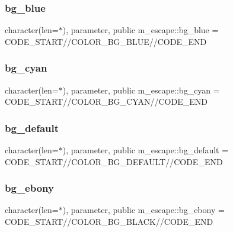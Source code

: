 \subsubsection{\texorpdfstring{bg\+\_\+blue}{bg\_blue}}
{\footnotesize\ttfamily character(len=$\ast$), parameter, public m\+\_\+escape\+::bg\+\_\+blue = C\+O\+D\+E\+\_\+\+S\+T\+A\+RT//C\+O\+L\+O\+R\+\_\+\+B\+G\+\_\+\+B\+L\+UE//C\+O\+D\+E\+\_\+\+E\+ND}

\mbox{\label{namespacem__escape_a7b7a979cd6dc44533f962d323c65a7b6}} 
\subsubsection{\texorpdfstring{bg\+\_\+cyan}{bg\_cyan}}
{\footnotesize\ttfamily character(len=$\ast$), parameter, public m\+\_\+escape\+::bg\+\_\+cyan = C\+O\+D\+E\+\_\+\+S\+T\+A\+RT//C\+O\+L\+O\+R\+\_\+\+B\+G\+\_\+\+C\+Y\+AN//C\+O\+D\+E\+\_\+\+E\+ND}

\mbox{\label{namespacem__escape_a329b88dbfe4ad42f896cdf408dcd9784}} 
\subsubsection{\texorpdfstring{bg\+\_\+default}{bg\_default}}
{\footnotesize\ttfamily character(len=$\ast$), parameter, public m\+\_\+escape\+::bg\+\_\+default = C\+O\+D\+E\+\_\+\+S\+T\+A\+RT//C\+O\+L\+O\+R\+\_\+\+B\+G\+\_\+\+D\+E\+F\+A\+U\+LT//C\+O\+D\+E\+\_\+\+E\+ND}

\mbox{\label{namespacem__escape_ab3691cc02cfaf12d6f7e18fac8a70b0b}} 
\subsubsection{\texorpdfstring{bg\+\_\+ebony}{bg\_ebony}}
{\footnotesize\ttfamily character(len=$\ast$), parameter, public m\+\_\+escape\+::bg\+\_\+ebony = C\+O\+D\+E\+\_\+\+S\+T\+A\+RT//C\+O\+L\+O\+R\+\_\+\+B\+G\+\_\+\+B\+L\+A\+CK//C\+O\+D\+E\+\_\+\+E\+ND}


